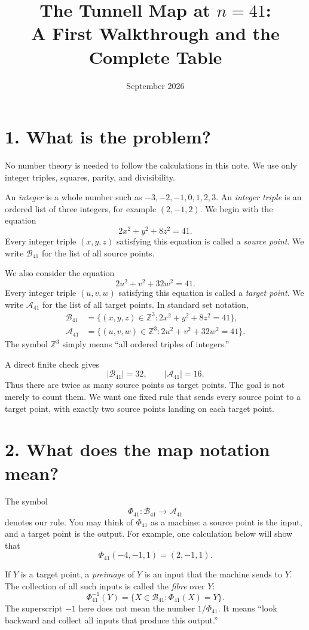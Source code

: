 \documentclass[11pt]{amsart}
\title[The Tunnell map at $n=41$]
{The Tunnell Map at $n=41$:\\
A First Walkthrough and the Complete Table}
\date{September 2026}
\newcommand{\Z}{\mathbb Z}
\newcommand{\B}{\mathcal B_{41}}
\newcommand{\A}{\mathcal A_{41}}
\newcommand{\PhiMap}{\Phi_{41}}
\begin{document}
\maketitle

\section*{1. What is the problem?}

No number theory is needed to follow the calculations in this note.  We use
only integer triples, squares, parity, and divisibility.

An \emph{integer} is a whole number such as
\(-3,-2,-1,0,1,2,3\).  An \emph{integer triple} is an ordered list of three
integers, for example \((2,-1,2)\).  We begin with the equation
\[
 2x^2+y^2+8z^2=41. \tag{source equation}
\]
Every integer triple \((x,y,z)\) satisfying this equation is called a
\emph{source point}.  We write \(\B\) for the list of all source points.

We also consider the equation
\[
 2u^2+v^2+32w^2=41. \tag{target equation}
\]
Every integer triple \((u,v,w)\) satisfying this equation is called a
\emph{target point}.  We write \(\A\) for the list of all target points.
In standard set notation,
\[
\begin{aligned}
 \B&=\{(x,y,z)\in\Z^3:2x^2+y^2+8z^2=41\},\\
 \A&=\{(u,v,w)\in\Z^3:2u^2+v^2+32w^2=41\}.
\end{aligned}
\]
The symbol \(\Z^3\) simply means ``all ordered triples of integers.''

A direct finite check gives
\[
 |\B|=32,
 \qquad
 |\A|=16.
\]
Thus there are twice as many source points as target points.  The goal is not
merely to count them.  We want one fixed rule that sends every source point to
a target point, with exactly two source points landing on each target point.

\newpage
\section*{2. What does the map notation mean?}

The symbol
\[
 \PhiMap:\B\longrightarrow\A
\]
denotes our rule.  You may think of \(\PhiMap\) as a machine: a source point
is the input, and a target point is the output.  For example, one calculation
below will show that
\[
 \PhiMap(-4,-1,1)=(2,-1,1).
\]

If \(Y\) is a target point, a \emph{preimage} of \(Y\) is an input that the
machine sends to \(Y\).  The collection of all such inputs is called the
\emph{fibre} over \(Y\):
\[
 \PhiMap^{-1}(Y)=\{X\in\B:\PhiMap(X)=Y\}.
\]
The superscript \(-1\) here does not mean the number \(1/\PhiMap\).  It means
``look backward and collect all inputs that produce this output.''
\end{document}
